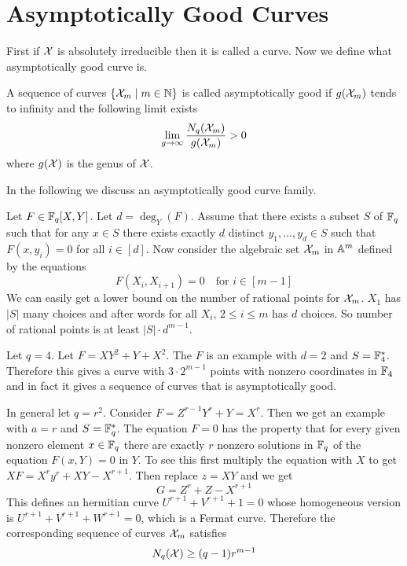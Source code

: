 \section{Asymptotically Good Curves}
First if $\mathcal{X}$ is absolutely irreducible then it is called a curve. Now we define what asymptotically good curve is. 
\begin{definition}
	A sequence of curves $\{\mathcal{X}_m\mid m\in \mathbb{N}\}$ is called asymptotically good if $g(\mathcal{X}_m)$ tends to infinity and the following limit exists $$\lim_{g\to \infty}\frac{N_q(\mathcal{X}_m)}{g(\mathcal{X}_m)}>0$$ where $g(\mathcal{X})$ is the genus of $\mathcal{X}$. 
\end{definition}
In the following we discuss an asymptotically good curve family. 

Let $F\in \mathbb{F}_q[X,Y]$. Let $d=\deg_Y(F)$. Assume that there exists a subset $S$ of $\mathbb{F}_q$ such that for any $x\in S$ there exists exactly $d$ distinct $y_1,\dots, y_d\in S$ such that $F(x,y_i)=0$ for all $i\in [d]$. Now consider the algebraic set $\mathcal{X}_m$ in $\mathbb{A}^m$ defined by the equations $$F(X_i,X_{i+1})=0\quad \text{for $i\in [m-1]$}$$We can easily get a lower bound on the number of rational points for $\mathcal{X}_m$. $X_1$ has $|S|$ many choices and after words for all $X_i$, $2\leq i\leq m$ has $d$ choices. So number of rational points is at least $|S|\cdot d^{m-1}$. 
\begin{example}
	Let $q=4$. Let $F=XY^2+Y+X^2$. The $F$ is an example with $d=2$ and $S=\mathbb{F}^*_4$. Therefore this gives a curve with $3\cdot 2^{m-1}$ points with nonzero coordinates in $\mathbb{F}_4$ and in fact it gives a sequence of curves that is asymptotically good. 
\end{example}
In general let $q=r^2$. Consider $F=Z^{r-1}Y^r+Y=X^r$. Then we get an example with $a=r$ and $S=\mathbb{F}_q^*$. The equation $F=0$ has the property that for every given nonzero element $x\in \mathbb{F}_q$ there are exactly $r$ nonzero solutions in $\mathbb{F}_q$ of the equation $F(x,Y)=0$ in $Y$. To see this first multiply the equation with $X$ to get $XF=X^ry^r+XY-X^{r+1}$. Then replace $z=XY$ and we get $$G=Z^{r}+Z-X^{r+1}$$ This defines an hermitian curve $U^{r+1}+V^{r+1}+1=0$ whose homogeneous version is $U^{r+1}+V^{r+1}+W^{r+1}=0$, which is a Fermat curve. Therefore the corresponding sequence of curves $\mathcal{X}_m$ satisfies $$N_q(\mathcal{X})\geq (q-1)r^{m-1}$$

